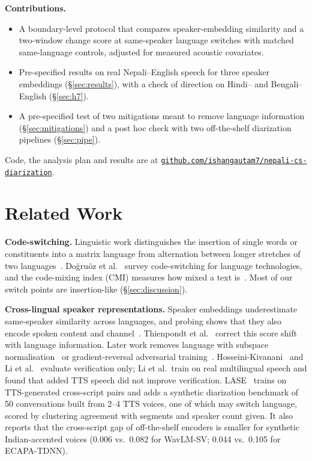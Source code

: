 \documentclass[conference]{IEEEtran}
\begin{document}
\noindent\textbf{Contributions.}
\begin{itemize}
  \item A boundary-level protocol that compares speaker-embedding similarity and a
        two-window change score at same-speaker language switches with matched
        same-language controls, adjusted for measured acoustic covariates.
  \item Pre-specified results on real Nepali--English speech for three speaker
        embeddings (\S\ref{sec:results}), with a check of direction on Hindi-- and
        Bengali--English (\S\ref{sec:h7}).
  \item A pre-specified test of two mitigations meant to remove language information (\S\ref{sec:mitigations})
        and a post hoc check with two off-the-shelf diarization pipelines (\S\ref{sec:pipe}).
\end{itemize}
Code, the analysis plan and results are at
\href{https://github.com/ishangautam7/nepali-cs-diarization}{\nolinkurl{github.com/ishangautam7/nepali-cs-diarization}}.

\section{Related Work}
\label{sec:related}
\textbf{Code-switching.}
Linguistic work distinguishes the insertion of single words or constituents into a matrix
language from alternation between longer stretches of two
languages~\cite{poplack1980,muysken2000}. Do\u{g}ru\"{o}z et al.~\cite{dogruoz2021survey}
survey code-switching for language technologies, and the code-mixing index (CMI) measures
how mixed a text is~\cite{gamback2016cmi}. Most of our switch points are insertion-like
(\S\ref{sec:discussion}).

\textbf{Cross-lingual speaker representations.}
Speaker embeddings underestimate same-speaker similarity across languages, and probing shows
that they also encode spoken content and channel~\cite{raj2019probing}. Thienpondt et
al.~\cite{thienpondt2022} correct this score shift with language information. Later work
removes language with subspace normalisation~\cite{hosseini2026} or gradient-reversal
adversarial training~\cite{menta2026lase,li2026}. Hosseini-Kivanani~\cite{hosseini2026} and
Li et al.~\cite{li2026} evaluate verification only; Li et al.\ train on real multilingual
speech and found that added TTS speech did not improve verification. LASE~\cite{menta2026lase}
trains on TTS-generated cross-script pairs and adds a synthetic diarization benchmark of 50
conversations built from 2--4 TTS voices, one of which may switch language, scored by
clustering agreement with segments and speaker count given. It also reports that the
cross-script gap of off-the-shelf encoders is smaller for synthetic Indian-accented voices
(0.006 vs.\ 0.082 for WavLM-SV; 0.044 vs.\ 0.105 for ECAPA-TDNN).
\end{document}
